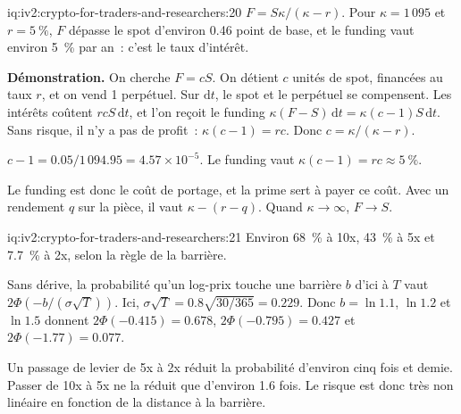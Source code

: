 \begin{solution}{iq:iv2:crypto-for-traders-and-researchers:20}
$F = S\kappa/(\kappa - r)$. Pour $\kappa = 1\,095$ et $r = 5~\%$, $F$ dépasse le spot d'environ 0.46 point de base, et le funding vaut environ 5~\% par an~: c'est le taux d'intérêt.

\textbf{Démonstration.} On cherche $F = cS$. On détient $c$ unités de spot, financées au taux $r$, et on vend 1 perpétuel. Sur $\mathrm{d}t$, le spot et le perpétuel se compensent. Les intérêts coûtent $rcS\,\mathrm{d}t$, et l'on reçoit le funding $\kappa(F - S)\,\mathrm{d}t = \kappa(c - 1)S\,\mathrm{d}t$. Sans risque, il n'y a pas de profit~: $\kappa(c - 1) = rc$. Donc $c = \kappa/(\kappa - r)$.

$c - 1 = 0.05/1\,094.95 = 4.57 \times 10^{-5}$. Le funding vaut $\kappa(c - 1) = rc \approx 5~\%$.

Le funding est donc le coût de portage, et la prime sert à payer ce coût. Avec un rendement $q$ sur la pièce, il vaut $\kappa - (r - q)$. Quand $\kappa \to \infty$, $F \to S$.

\end{solution}

\begin{solution}{iq:iv2:crypto-for-traders-and-researchers:21}
Environ 68~\% à 10x, 43~\% à 5x et 7.7~\% à 2x, selon la règle de la barrière.

Sans dérive, la probabilité qu'un log-prix touche une barrière $b$ d'ici à $T$ vaut $2\Phi(-b/(\sigma\sqrt{T}))$. Ici, $\sigma\sqrt{T} = 0.8\sqrt{30/365} = 0.229$. Donc $b = \ln 1.1$, $\ln 1.2$ et $\ln 1.5$ donnent $2\Phi(-0.415) = 0.678$, $2\Phi(-0.795) = 0.427$ et $2\Phi(-1.77) = 0.077$.

Un passage de levier de 5x à 2x réduit la probabilité d'environ cinq fois et demie. Passer de 10x à 5x ne la réduit que d'environ 1.6 fois. Le risque est donc très non linéaire en fonction de la distance à la barrière.

\end{solution}

